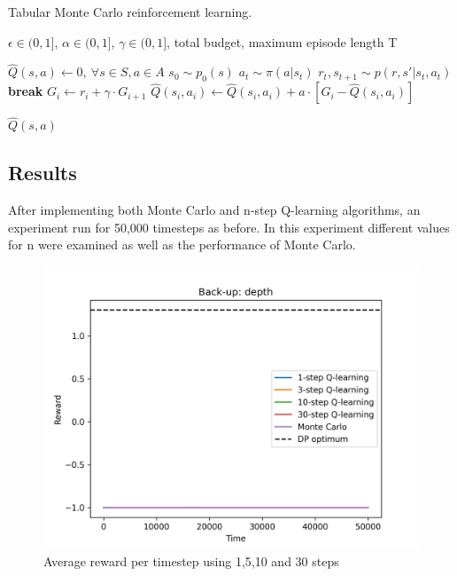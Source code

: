 \documentclass{article}
\begin{document}
\begin{algorithm}[h]
    \caption{Tabular Monte Carlo reinforcement learning.}
    \label{alg:Tabular Monte Carlo reinforcement learning.}
 \begin{algorithmic}
     $\epsilon \in (0,1]$, $\alpha \in (0,1]$, $\gamma \in (0,1]$, total budget, maximum episode length T
    
    \STATE $\hat{Q}(s,a) \leftarrow 0,\ \forall s \in S, a \in A$
        \STATE $s_0 \sim p_0(s)$
            \STATE $a_t \sim \pi(a|s_t)$
            \STATE $r_t,s_{t+1} \sim p(r,s'|s_t,a_t)$
                \STATE \textbf{break}
            \ENDIF
        \ENDFOR
            \STATE $G_i \leftarrow r_i + \gamma \cdot G_{i+1}$
            \STATE $\hat{Q}(s_i,a_i) \leftarrow \hat{Q}(s_i,a_i) + a \cdot [G_i - \hat{Q}(s_i,a_i)] $
        \ENDFOR
    \ENDWHILE
    
     $\hat{Q}(s,a)$
 \end{algorithmic}
\end{algorithm}


\subsection{Results}
After implementing both Monte Carlo and n-step Q-learning algorithms, an experiment run for 50,000 timesteps as before.
In this experiment different values for n were examined as well as the performance of Monte Carlo.

\begin{figure}[h]
    \includegraphics[scale=0.5]{images/depth.png}
    \caption{Average reward per timestep using 1,5,10 and 30 steps}
    \label{fig:katastrofi}
\end{figure}
\end{document}
